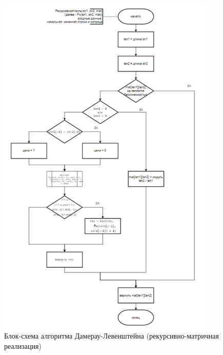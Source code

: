 \begin{figure}[H]
    \centering
    \includegraphics[width=0.93\textwidth]{img/block_2_3_1.png}
    \caption{Блок-схема алгоритма Дамерау-Левенштейна (рекурсивно-матричная\\ реализация)}
\end{figure}

